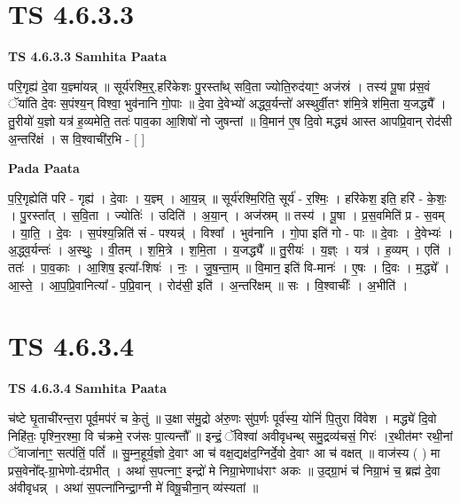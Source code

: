 \documentclass[17pt]{extarticle}
\begin{document}
\section*{ TS 4.6.3.3 }

\textbf{TS 4.6.3.3 } \newline
\textbf{Samhita Paata} \newline

परि॒गृह्य॑ दे॒वा य॒ज्ञ्मा॑यन्न् ॥ सूर्य॑रश्मि॒र्॒.हरि॑केशः पु॒रस्ता᳚थ् सवि॒ता ज्योति॒रुद॑याꣳ॒॒ अज॑स्रं । तस्य॑ पू॒षा प्र॑स॒वं ॅया॑ति दे॒वः स॒पंश्य॒न् विश्वा॒ भुव॑नानि गो॒पाः ॥ दे॒वा दे॒वेभ्यो॑ अद्ध्व॒र्यन्तो॑ अस्थुर्वी॒तꣳ श॑मि॒त्रे श॑मि॒ता य॒जद्ध्यै᳚ । तु॒रीयो॑ य॒ज्ञो यत्र॑ ह॒व्यमेति॒ ततः॑ पाव॒का आ॒शिषो॑ नो जुषन्तां ॥ वि॒मान॑ ए॒ष दि॒वो मद्ध्य॑ आस्त आपप्रि॒वान् रोद॑सी अ॒न्तरि॑क्षं । स वि॒श्वाची॑र॒भि - [  ] \newline

\textbf{Pada Paata} \newline

प॒रि॒गृह्येति॑ परि - गृह्य॑ । दे॒वाः । य॒ज्ञ्म् । आ॒य॒न्न् ॥ सूर्य॑रश्मि॒रिति॒ सूर्य॑ - र॒श्मिः॒ । हरि॑केश॒ इति॒ हरि॑ - के॒शः॒ । पु॒रस्ता᳚त् । स॒वि॒ता । ज्योतिः॑ । उदिति॑ । अ॒या॒न् । अज॑स्रम् ॥ तस्य॑ । पू॒षा । प्र॒स॒वमिति॑ प्र - स॒वम् । या॒ति॒ । दे॒वः । स॒पंश्य॒न्निति॑ सं - पश्यन्न्॑ । विश्वा᳚ । भुव॑नानि । गो॒पा इति॑ गो - पाः ॥ दे॒वाः । दे॒वेभ्यः॑ । अ॒द्ध्व॒र्यन्तः॑ । अ॒स्थुः॒ । वी॒तम् । श॒मि॒त्रे । श॒मि॒ता । य॒जद्ध्यै᳚ ॥ तु॒रीयः॑ । य॒ज्ञ्ः । यत्र॑ । ह॒व्यम् । एति॑ । ततः॑ । पा॒व॒काः । आ॒शिष॒ इत्या᳚-शिषः॑ । नः॒ । जु॒ष॒न्ता॒म् ॥ वि॒मान॒ इति॑ वि-मानः॑ । ए॒षः । दि॒वः । म॒द्ध्ये᳚ । आ॒स्ते॒ । आ॒प॒प्रि॒वानित्या᳚ - प॒प्रि॒वान् । रोद॑सी॒ इति॑ । अ॒न्तरि॑क्षम् ॥ सः । वि॒श्वाचीः᳚ । अ॒भीति॑ ।  \newline




\section*{ TS 4.6.3.4 }

\textbf{TS 4.6.3.4 } \newline
\textbf{Samhita Paata} \newline

च॑ष्टे घृ॒ताची॑रन्त॒रा पूर्व॒मप॑रं च के॒तुं ॥ उ॒क्षा स॑मु॒द्रो अ॑रु॒णः सु॑प॒र्णः पूर्व॑स्य॒ योनिं॑ पि॒तुरा वि॑वेश । मद्ध्ये॑ दि॒वो निहि॑तः॒ पृश्नि॒रश्मा॒ वि च॑क्रमे॒ रज॑सः पा॒त्यन्तौ᳚ ॥ इन्द्रं॒ ॅविश्वा॑ अवीवृधन्थ् समु॒द्रव्य॑चसं॒ गिरः॑ ।र॒थीत॑मꣳ रथी॒नां ॅवाजा॑नाꣳ॒॒ सत्प॑तिं॒ पतिं᳚ ॥ सु॒म्न॒हूर्य॒ज्ञो दे॒वाꣳ आ च॑ वक्ष॒द्यक्ष॑द॒ग्निर्दे॒वो दे॒वाꣳ आ च॑ वक्षत् ॥ वाज॑स्य ( ) मा प्रस॒वेनो᳚द्-ग्रा॒भेणो-द॑ग्रभीत् । अथा॑ स॒पत्नाꣳ॒॒ इन्द्रो॑ मे निग्रा॒भेणाध॑राꣳ अकः ॥ उ॒द्ग्रा॒भं च॑ निग्रा॒भं च॒ ब्रह्म॑ दे॒वा अ॑वीवृधन्न् । अथा॑ स॒पत्ना॑निन्द्रा॒ग्नी मे॑ विषू॒चीना॒न् व्य॑स्यतां ॥ \newline
\end{document}
